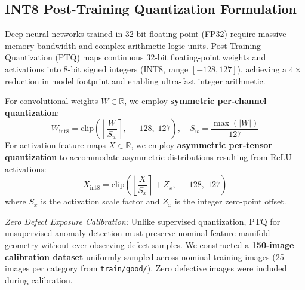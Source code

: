 \documentclass[journal,twocolumn]{IEEEtran}
\begin{document}
\subsection{INT8 Post-Training Quantization Formulation}
Deep neural networks trained in 32-bit floating-point (FP32) require massive memory bandwidth and complex arithmetic logic units. Post-Training Quantization (PTQ) maps continuous 32-bit floating-point weights and activations into 8-bit signed integers (INT8, range $[-128, 127]$), achieving a $4\times$ reduction in model footprint and enabling ultra-fast integer arithmetic.

For convolutional weights $W \in \mathbb{R}$, we employ \textbf{symmetric per-channel quantization}:
\begin{equation}
W_{\text{int8}} = \text{clip}\left( \left\lfloor \frac{W}{S_w} \right\rceil, \; -128, \; 127 \right), \quad S_w = \frac{\max(|W|)}{127}
\end{equation}
For activation feature maps $X \in \mathbb{R}$, we employ \textbf{asymmetric per-tensor quantization} to accommodate asymmetric distributions resulting from ReLU activations:
\begin{equation}
X_{\text{int8}} = \text{clip}\left( \left\lfloor \frac{X}{S_x} \right\rceil + Z_x, \; -128, \; 127 \right)
\end{equation}
where $S_x$ is the activation scale factor and $Z_x$ is the integer zero-point offset.

\textit{Zero Defect Exposure Calibration:} Unlike supervised quantization, PTQ for unsupervised anomaly detection must preserve nominal feature manifold geometry without ever observing defect samples. We constructed a \textbf{150-image calibration dataset} uniformly sampled across nominal training images (25 images per category from \texttt{train/good/}). Zero defective images were included during calibration.
\end{document}
